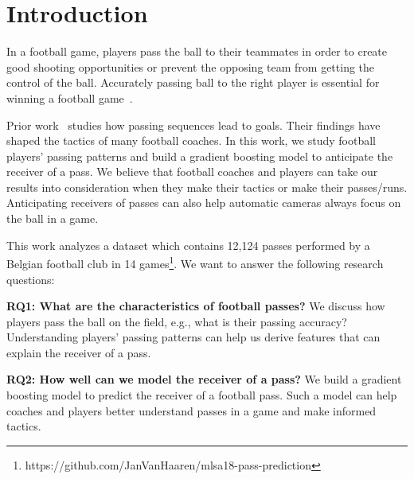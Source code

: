\section{Introduction} \label{intro}
In a football game, players pass the ball to their teammates in order to create good shooting opportunities or prevent the opposing team from getting the control of the ball.
Accurately passing ball to the right player is essential for winning a football game~\cite{Ali2011Measuring,Hughes2005Analysis}.

Prior work~\cite{reep1968skill,Hughes2005Analysis} studies how passing sequences lead to goals. Their findings have shaped the tactics of many football coaches.
In this work, we study football players' passing patterns and build a gradient boosting model to anticipate the receiver of a pass.
We believe that football coaches and players can take our results into consideration when they make their tactics or make their passes/runs. 
Anticipating receivers of passes can also help automatic cameras always focus on the ball in a game.

This work analyzes a dataset which contains 12,124 passes performed by a Belgian football club in 14 games\footnote{\label{origin_dataset}https://github.com/JanVanHaaren/mlsa18-pass-prediction}. We want to answer the following research questions: 

\begin{description}
	\item \textbf{RQ1: What are the characteristics of football passes?}
	We discuss how players pass the ball on the field, e.g., what is their passing accuracy? %
	Understanding players' passing patterns can help us derive features that can explain the receiver of a pass. 
	
	\item \textbf{RQ2: How well can we model the receiver of a pass?}
	We build a gradient boosting model to predict the receiver of a football pass. 
	Such a model can help coaches and players better understand passes in a game and make informed tactics.
	
\end{description}

